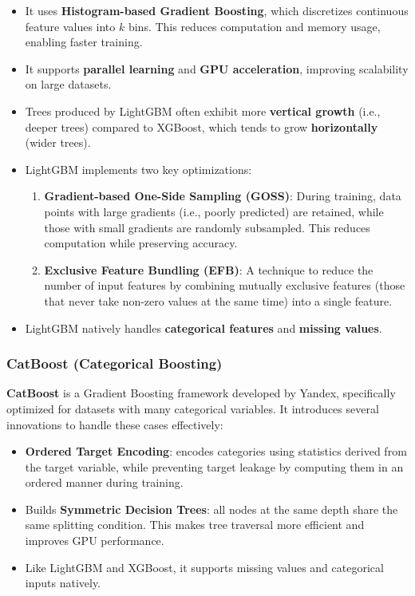 \begin{itemize}
    \item It uses \textbf{Histogram-based Gradient Boosting}, which discretizes continuous feature values into $k$ bins. This reduces computation and memory usage, enabling faster training.
    
    \item It supports \textbf{parallel learning} and \textbf{GPU acceleration}, improving scalability on large datasets.
    
    \item Trees produced by LightGBM often exhibit more \textbf{vertical growth} (i.e., deeper trees) compared to XGBoost, which tends to grow \textbf{horizontally} (wider trees).

    \item LightGBM implements two key optimizations:
    \begin{enumerate}
        \item \textbf{Gradient-based One-Side Sampling (GOSS)}:  
        During training, data points with large gradients (i.e., poorly predicted) are retained, while those with small gradients are randomly subsampled. This reduces computation while preserving accuracy.

        \item \textbf{Exclusive Feature Bundling (EFB)}:  
        A technique to reduce the number of input features by combining mutually exclusive features (those that never take non-zero values at the same time) into a single feature.
    \end{enumerate}

    \item LightGBM natively handles \textbf{categorical features} and \textbf{missing values}.
\end{itemize}

\subsubsection{CatBoost (Categorical Boosting)}

\textbf{CatBoost} is a Gradient Boosting framework developed by Yandex, specifically optimized for datasets with many categorical variables. It introduces several innovations to handle these cases effectively:

\begin{itemize}
    \item \textbf{Ordered Target Encoding}:  
    encodes categories using statistics derived from the target variable, while preventing target leakage by computing them in an ordered manner during training.
    \item Builds \textbf{Symmetric Decision Trees}:  
    all nodes at the same depth share the same splitting condition. This makes tree traversal more efficient and improves GPU performance.
    \item Like LightGBM and XGBoost, it supports missing values and categorical inputs natively.
\end{itemize}

